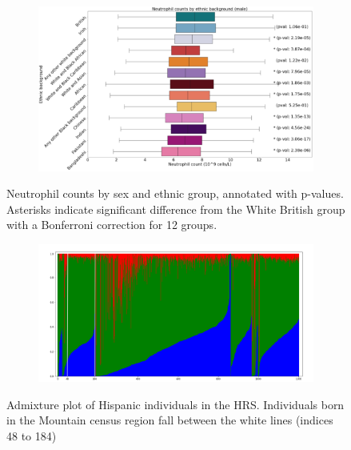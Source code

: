 \documentclass[12pt]{pnas-new}
\begin{document}
\begin{figure}
    \centering
    \begin{subfigure}{\textwidth}
    \includegraphics[width=\textwidth]{images/male_neutrophil_boxplot_annotated.pdf}
    \end{subfigure}
    \caption{Neutrophil counts by sex and ethnic group, annotated with p-values. Asterisks indicate significant difference from the White British group with a Bonferroni correction for 12 groups.}
    \label{fig:supp_box_neutrophill_m}
\end{figure}



\begin{figure}
    \centering
    \begin{subfigure}{\textwidth}
    \includegraphics[width=\textwidth]{images/admixture_plot_highlight_mountain_copy.pdf}
    \end{subfigure}
    \caption{Admixture plot of Hispanic individuals in the HRS. Individuals born in the Mountain census region fall between the white lines (indices 48 to 184)}
    \label{fig:supp_hrs_hisp_admix}
\end{figure}
\end{document}
